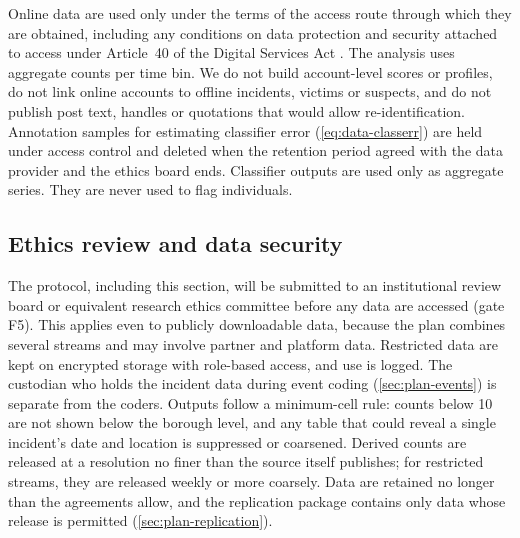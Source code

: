 Online data are used only under the terms of the access route through which
they are obtained, including any conditions on data protection and security
attached to access under Article~40 of the Digital Services Act
\citep{eu2022dsa}. The analysis uses aggregate counts per time bin. We do
not build account-level scores or profiles, do not link online accounts to
offline incidents, victims or suspects, and do not publish post text,
handles or quotations that would allow re-identification. Annotation
samples for estimating classifier error (\cref{eq:data-classerr}) are held
under access control and deleted when the retention period agreed with the
data provider and the ethics board ends. Classifier outputs are used only as
aggregate series. They are never used to flag individuals.

\subsection{Ethics review and data security}\label{sec:ethics-irb}

The protocol, including this section, will be submitted to an institutional
review board or equivalent research ethics committee before any data are
accessed (gate F5). This applies even to publicly downloadable data, because
the plan combines several streams and may involve partner and platform
data. Restricted data are kept on encrypted storage with role-based access,
and use is logged. The custodian who holds the incident data during event
coding (\cref{sec:plan-events}) is separate from the coders. Outputs follow
a minimum-cell rule: counts below 10 are not shown below the borough level,
and any table that could reveal a single incident's date and location is
suppressed or coarsened. Derived counts are released at a resolution no
finer than the source itself publishes; for restricted streams, they are
released weekly or more coarsely. Data are retained no longer than the agreements
allow, and the replication package contains only data whose release is
permitted (\cref{sec:plan-replication}).
